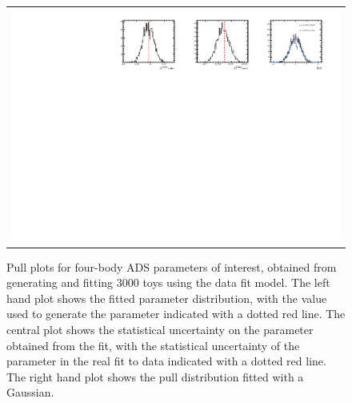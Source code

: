 \begin{figure}
\begin{tabular}{c}
\includegraphics[width=\textwidth]{ANA_resources/Plots/Data_fit/FitterBias//split//A_Bs_piKpipi.pdf} \\
  \end{tabular}
  \caption{Pull plots for four-body ADS parameters of interest, obtained from generating and fitting 3000 toys using the data fit model. The left hand plot shows the fitted parameter distribution, with the value used to generate the parameter indicated with a dotted red line. The central plot shows the statistical uncertainty on the parameter obtained from the fit, with the statistical uncertainty of the parameter in the real fit to data indicated with a dotted red line. The right hand plot shows the pull distribution fitted with a Gaussian.}
\label{fig:fourBody_ADS/split/_pulls}
\end{figure}
